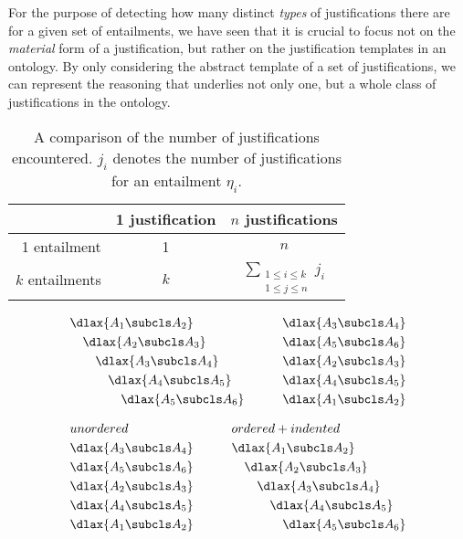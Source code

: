 For the purpose of detecting how many distinct \emph{types} of justifications there are for a given set of entailments, we have seen that it is crucial to focus not on the \emph{material} form of a justification, but rather on the justification templates in an ontology. By only considering the abstract template of a set of justifications, we can represent the reasoning that underlies not only one, but a whole class of justifications in the ontology.




\begin{table}
\caption{A comparison of the number of justifications encountered. $j_{i}$ denotes the number of justifications for an entailment $\eta_{i}$.}
\label{tab:justencounters}
\centering
\begin{tabu}{rcc}
\toprule 
 & 1 justification & $n$ justifications \\ 
 entailment & 1 & $n$ \\ 
$k$ entailments & $k$ & $\sum\limits_{\substack{1\leq i\leq k \\
   1\leq j \leq n}} j_{i}$ \\ 
\bottomrule 
\end{tabu} 
\end{table}


\begin{examp}
\begin{alignat*}{2}
	&\dlax{A_{1} \subcls A_{2}} & \quad\quad &\dlax{A_{3} \subcls A_{4}}\\
	&\quad \dlax{A_{2} \subcls A_{3}} & \quad\quad &\dlax{A_{5} \subcls A_{6}}\\
	&\quad \quad \dlax{A_{3} \subcls A_{4}} & \quad\quad &\dlax{A_{2} \subcls A_{3}}\\
	&\quad \quad \quad \dlax{A_{4} \subcls A_{5}} & \quad\quad &\dlax{A_{4} \subcls A_{5}}\\
	&\quad \quad \quad \quad \dlax{A_{5} \subcls A_{6}} & \quad\quad &\dlax{A_{1} \subcls A_{2}}
	\end{alignat*}\label{ex:ordering}
\end{examp}


\begin{examp}
\begin{alignat*}{2}
	& unordered & \quad\quad    & ordered+indented \\
	& \dlax{A_{3} \subcls A_{4}}&    \quad\quad    &\dlax{A_{1} \subcls A_{2}}\\
	& \dlax{A_{5} \subcls A_{6}}&    \quad\quad    &\quad \dlax{A_{2} \subcls A_{3}}\\
	& \dlax{A_{2} \subcls A_{3}}&    \quad\quad    &\quad \quad \dlax{A_{3} \subcls A_{4}} \\
	&\dlax{A_{4} \subcls A_{5}} & 	\quad\quad 	&\quad \quad \quad \dlax{A_{4} \subcls A_{5}} \\
	&\dlax{A_{1} \subcls A_{2}} & \quad\quad & \quad \quad \quad \quad \dlax{A_{5} \subcls A_{6}}
	\end{alignat*}\label{ex:ordering}
\end{examp}


